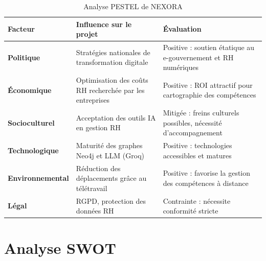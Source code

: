 \documentclass[12pt,a4paper]{report}
\begin{document}
\begin{table}[H]
\centering
\caption{Analyse PESTEL de NEXORA}
\label{tab:pestel}
\begin{tabular}{p{2.8cm} p{5cm} p{6.5cm}}
\toprule
\textbf{Facteur} & \textbf{Influence sur le projet} & \textbf{Évaluation} \\
\midrule
\textbf{Politique} & Stratégies nationales de transformation digitale & Positive : soutien étatique au e-gouvernement et RH numériques \\
\textbf{Économique} & Optimisation des coûts RH recherchée par les entreprises & Positive : ROI attractif pour cartographie des compétences \\
\textbf{Socioculturel} & Acceptation des outils IA en gestion RH & Mitigée : freins culturels possibles, nécessité d'accompagnement \\
\textbf{Technologique} & Maturité des graphes Neo4j et LLM (Groq) & Positive : technologies accessibles et matures \\
\textbf{Environnemental} & Réduction des déplacements grâce au télétravail & Positive : favorise la gestion des compétences à distance \\
\textbf{Légal} & RGPD, protection des données RH & Contrainte : nécessite conformité stricte \\
\bottomrule
\end{tabular}
\end{table}

\section{Analyse SWOT}
\end{document}
